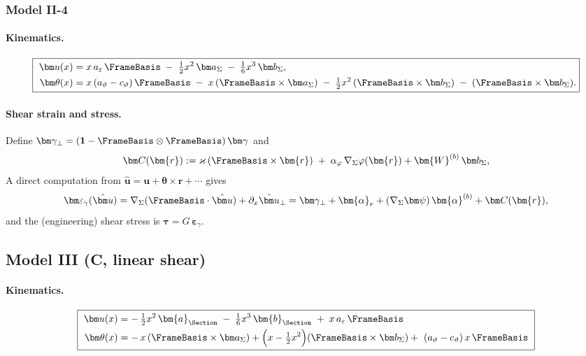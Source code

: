 \subsubsection{Model II-4}

\paragraph{Kinematics.}
\[
\boxed{\
\begin{aligned}
\bm u(x)&=x\,a_\varepsilon\,\FrameBasis\;-\;\tfrac12 x^2\,\bm a_\Sigma\;-\;\tfrac16 x^3\,\bm b_\Sigma,\\
\bm\theta(x)&=x\,(a_\vartheta-c_\vartheta)\,\FrameBasis
\;-\;x\,(\FrameBasis\times\bm a_\Sigma)\;-\;\tfrac12 x^2\,(\FrameBasis\times\bm b_\Sigma)\;-\;(\FrameBasis\times\bm b_\Sigma).
\end{aligned}}
\]


\paragraph{Shear strain and stress.}
Define \(\bm\gamma_\perp=(\mathbf{1}-\FrameBasis\otimes\FrameBasis)\,\bm\gamma\) and
\[
\bm C(\bm{r}):=\varkappa\,(\FrameBasis\times\bm{r})\;+\;\alpha_\varphi\,\nabla_\Sigma\varphi(\bm{r})+\bm{W}^{(b)}\,\bm b_\Sigma,
\]
A direct computation from \(\hat{\bm u}=\bm u+\bm\theta\times\bm{r}+\cdots\) gives
\[
\bm\varepsilon_\gamma(\hat{\bm u})
=\nabla_\Sigma(\FrameBasis\cdot\hat{\bm u})+\partial_x\hat{\bm u}_\perp
=\bm\gamma_\perp+\bm{\alpha}_r+(\nabla_\Sigma\bm\psi)\,\bm{\alpha}^{(b)}+\bm C(\bm{r}),
\]
and the (engineering) shear stress is \(\bm\tau=G\,\bm\varepsilon_\gamma\).




\subsection{Model III (C, linear shear)}

\paragraph{Kinematics.}

\begin{equation*}
\boxed{\ 
\begin{aligned}
\bm u(x) &=
-\,\tfrac{1}{2} x^2\,\bm{a}_{\Section}\;-\;\tfrac16 x^3\,\bm{b}_{\Section}\;+\;x\,a_\varepsilon\,\FrameBasis\\
\bm\theta(x)&=
-\,x\,(\FrameBasis\times\bm a_\Sigma)
+\Big(x-\tfrac{1}{2} x^2\Big)(\FrameBasis\times\bm b_\Sigma)
+\ (a_\vartheta-c_\vartheta)\,x\,\FrameBasis
\end{aligned}\ }
\end{equation*}




